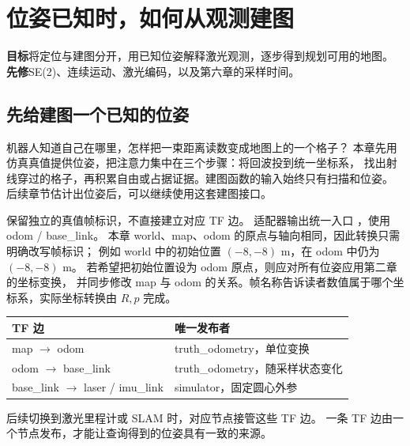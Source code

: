 \chapter{位姿已知时，如何从观测建图}\label{ch:mapping}
\begin{notebox}
\textbf{目标}\quad 将定位与建图分开，用已知位姿解释激光观测，逐步得到规划可用的地图。\\
\textbf{先修}\quad SE(2)、连续运动、激光编码，以及第六章的采样时间。
\end{notebox}

\section{先给建图一个已知的位姿}
机器人知道自己在哪里，怎样把一束距离读数变成地图上的一个格子？
本章先用仿真真值提供位姿，把注意力集中在三个步骤：将回波投到统一坐标系，
找出射线穿过的格子，再积累自由或占据证据。建图函数的输入始终只有扫描和位姿。
后续章节估计出位姿后，可以继续使用这套建图接口。

\begin{center}
\end{center}

 保留独立的真值帧标识，不直接建立对应 TF 边。
适配器输出统一入口 ，使用 odom / base\_link。
本章 world、map、odom 的原点与轴向相同，因此转换只需明确改写帧标识；
例如 world 中的初始位置 $(-8,-8)$ m，在 odom 中仍为 $(-8,-8)$ m。
若希望把初始位置设为 odom 原点，则应对所有位姿应用第二章的坐标变换，
并同步修改 map 与 odom 的关系。帧名称告诉读者数值属于哪个坐标系，实际坐标转换由 $R,p$ 完成。

\begin{center}
\begin{tabular}{ll}
\toprule
TF 边 & 唯一发布者\\\midrule
map $\to$ odom & truth\_odometry，单位变换\\
odom $\to$ base\_link & truth\_odometry，随采样状态变化\\
base\_link $\to$ laser / imu\_link & simulator，固定圆心外参\\
\bottomrule
\end{tabular}
\end{center}
后续切换到激光里程计或 SLAM 时，对应节点接管这些 TF 边。
一条 TF 边由一个节点发布，才能让查询得到的位姿具有一致的来源。

